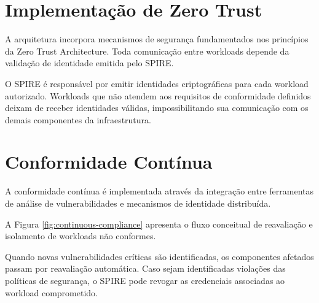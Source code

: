 \begin{table}[ht!]
\centering
{}
\end{table}

\section{Implementação de Zero Trust}

A arquitetura incorpora mecanismos de segurança fundamentados nos princípios da Zero Trust Architecture. Toda comunicação entre workloads depende da validação de identidade emitida pelo SPIRE.

O SPIRE é responsável por emitir identidades criptográficas para cada workload autorizado. Workloads que não atendem aos requisitos de conformidade definidos deixam de receber identidades válidas, impossibilitando sua comunicação com os demais componentes da infraestrutura.

\section{Conformidade Contínua}

A conformidade contínua é implementada através da integração entre ferramentas de análise de vulnerabilidades e mecanismos de identidade distribuída.

A Figura \ref{fig:continuous-compliance} apresenta o fluxo conceitual de reavaliação e isolamento de workloads não conformes.



Quando novas vulnerabilidades críticas são identificadas, os componentes afetados passam por reavaliação automática. Caso sejam identificadas violações das políticas de segurança, o SPIRE pode revogar as credenciais associadas ao workload comprometido.

